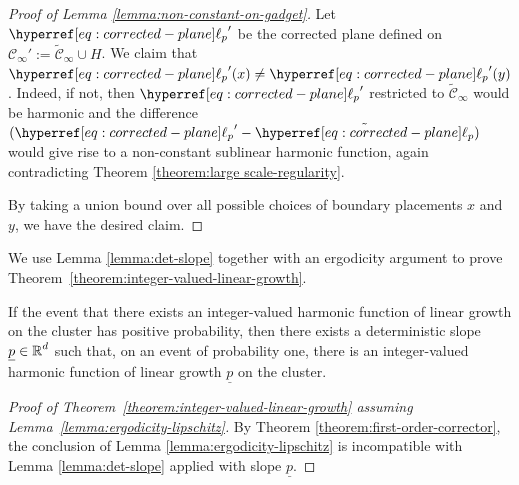 \documentclass[12pt]{amsart}
\numberwithin{equation}{section}
\begin{document}
\begin{proof}[Proof of Lemma \ref{lemma:non-constant-on-gadget}]
		Let ${\ellp{p}}'$ be the corrected plane defined on $\mathscr{C}_{\infty}' := \mathscr{\tilde C}_{\infty} \cup H$. We claim that ${\ellp{p}}'(x) \neq  {\ellp{p}}'(y)$. Indeed, if not, then ${\ellp{p}}'$ restricted to $\mathscr{\tilde C}_{\infty}$ would be harmonic and the difference $({\ellp{p}}' - \tilde{\ellp{p}})$ would give rise to a non-constant sublinear harmonic function, again contradicting Theorem \ref{theorem:large scale-regularity}. 
		
		By taking a union bound over all possible choices of boundary placements $x$ and $y$, we have the desired claim. 
	\end{proof}
	
	
	
	We use Lemma \ref{lemma:det-slope} together with an ergodicity argument to prove Theorem~\ref{theorem:integer-valued-linear-growth}. 
	\begin{lemma} \label{lemma:ergodicity-lipschitz}
		If the event that there exists an integer-valued harmonic function of linear growth on the cluster 
		has positive probability, then there exists a deterministic slope $\underline{p} \in \operatorname{\mathbb{R}}^d$
		such that, on an event of probability one, there is an integer-valued harmonic function
		of linear growth $\underline{p}$ on the cluster. 
	\end{lemma}
	\begin{proof}[Proof of Theorem~\ref{theorem:integer-valued-linear-growth} assuming Lemma~\ref{lemma:ergodicity-lipschitz}]
		By Theorem \ref{theorem:first-order-corrector}, the conclusion of Lemma \ref{lemma:ergodicity-lipschitz} is incompatible with Lemma \ref{lemma:det-slope} applied with slope $\underline{p}$. 
	\end{proof}
\end{document}
